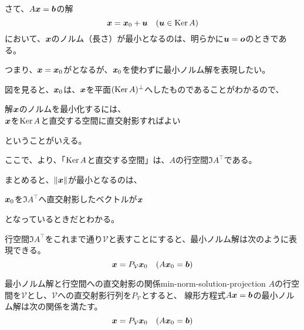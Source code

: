 \documentclass[../../../topic_linear-algebra]{subfiles}
\begin{document}
さて、$A\vb*{x} = \vb*{b}$の解
\begin{equation*}
  \vb*{x} = \vb*{x}_0 + \vb*{u} \quad (\vb*{u} \in \operatorname{Ker} A)
\end{equation*}
において、$\vb*{x}$のノルム（長さ）が最小となるのは、明らかに$\vb*{u} = \vb*{o}$のときである。

つまり、$\vb*{x} = \vb*{x}_0$がとなるが、$\vb*{x}_0$を使わずに最小ノルム解を表現したい。

\br

図を見ると、$\vb*{x}_0$は、$\vb*{x}$を平面$(\operatorname{Ker} A)^\perp$へしたものであることがわかるので、
\begin{emphabox}
  \begin{spacebox}
    \begin{center}
      解$\vb*{x}$のノルムを最小化するには、\\
      $\vb*{x}$を$\operatorname{Ker} A$と直交する空間に直交射影すればよい
    \end{center}
  \end{spacebox}
\end{emphabox}
ということがいえる。

\br

ここで、より、「$\operatorname{Ker} A$と直交する空間」は、$A$の行空間$\Im A^\top$である。

\br

まとめると、$\| \vb*{x} \|$が最小となるのは、
\begin{spacebox}
  \begin{center}
    $\vb*{x}_0$を$\Im A^\top$へ直交射影したベクトルが$\vb*{x}$
  \end{center}
\end{spacebox}
となっているときだとわかる。

\br

行空間$\Im A^\top$をこれまで通り$\mathcal{V}$と表すことにすると、最小ノルム解は次のように表現できる。
\begin{equation*}
  \vb*{x} = P_{\mathcal{V}} \vb*{x}_0 \quad (A\vb*{x}_0 = \vb*{b})
\end{equation*}

\begin{theorem}{最小ノルム解と行空間への直交射影の関係}{min-norm-solution-projection}
  $A$の行空間を$\mathcal{V}$とし、$\mathcal{V}$への直交射影行列を$P_{\mathcal{V}}$とすると、
  線形方程式$A\vb*{x} = \vb*{b}$の最小ノルム解は次の関係を満たす。
  \begin{equation*}
    \vb*{x} = P_{\mathcal{V}} \vb*{x}_0 \quad (A\vb*{x}_0 = \vb*{b})
  \end{equation*}
\end{theorem}
\end{document}
